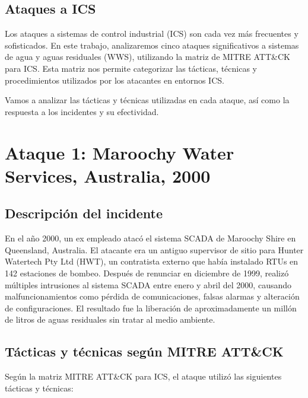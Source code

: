 \subsection{Ataques a ICS}
Los ataques a sistemas de control industrial (ICS) son cada vez más frecuentes y sofisticados. En este trabajo, analizaremos cinco ataques significativos a sistemas de agua y aguas residuales (WWS), utilizando la matriz de MITRE ATT\&CK para ICS. Esta matriz nos permite categorizar las tácticas, técnicas y procedimientos utilizados por los atacantes en entornos ICS.

Vamos a analizar las tácticas y técnicas utilizadas en cada ataque, así como la respuesta a los incidentes y su efectividad.
\newpage
\section{Ataque 1: Maroochy Water Services, Australia, 2000}

\subsection{Descripción del incidente}
En el año 2000, un ex empleado atacó el sistema SCADA de Maroochy Shire en Queensland, Australia. El atacante era un antiguo supervisor de sitio para Hunter Watertech Pty Ltd (HWT), un contratista externo que había instalado RTUs en 142 estaciones de bombeo. Después de renunciar en diciembre de 1999, realizó múltiples intrusiones al sistema SCADA entre enero y abril del 2000, causando malfuncionamientos como pérdida de comunicaciones, falsas alarmas y alteración de configuraciones. El resultado fue la liberación de aproximadamente un millón de litros de aguas residuales sin tratar al medio ambiente.


\subsection{Tácticas y técnicas según MITRE ATT\&CK}
Según la matriz MITRE ATT\&CK para ICS, el ataque utilizó las siguientes tácticas y técnicas:

